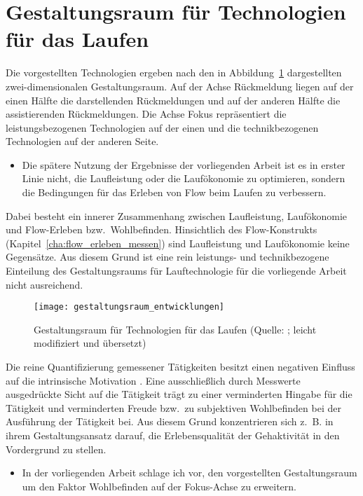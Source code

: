 

\section{Gestaltungsraum für Technologien für das Laufen} 

\label{sec:gestaltungsraum_fur_technologien_fur_das_laufen}

Die vorgestellten Technologien ergeben nach \citet{Jensen2014} den in Abbildung~\ref{fig:gestaltungsraum_entwicklungen} dargestellten zwei-dimensionalen Gestaltungsraum. Auf der Achse Rückmeldung liegen auf der einen Hälfte die darstellenden Rückmeldungen und auf der anderen Hälfte die assistierenden Rückmeldungen. Die Achse Fokus repräsentiert die leistungsbezogenen Technologien auf der einen und die technikbezogenen Technologien auf der anderen Seite. 
\begin{itemize}
	
	\item Die spätere Nutzung der Ergebnisse der vorliegenden Arbeit ist es in erster Linie nicht, die Laufleistung oder die Laufökonomie zu optimieren, sondern die Bedingungen für das Erleben von Flow beim Laufen zu verbessern. 
\end{itemize}

Dabei besteht ein innerer Zusammenhang zwischen Laufleistung, Laufökonomie und Flow-Erleben bzw.\ Wohlbefinden. Hinsichtlich des Flow-Konstrukts (Kapitel~\ref{cha:flow_erleben_messen}) sind Laufleistung und Laufökonomie keine Gegensätze. Aus diesem Grund ist eine rein leistungs- und technikbezogene Einteilung des Gestaltungsraums für Lauftechnologie für die vorliegende Arbeit nicht ausreichend. 
\begin{figure}
	[!htb] \centering 
	\texttt{[image: gestaltungsraum\_entwicklungen]} \caption[Gestaltungsraum für Technologien für das Laufen]{Gestaltungsraum für Technologien für das Laufen (Quelle: \citet{Jensen2014}; leicht modifiziert und übersetzt)}\label{fig:gestaltungsraum_entwicklungen} 
\end{figure}

Die reine Quantifizierung gemessener Tätigkeiten besitzt einen negativen Einfluss auf die intrinsische Motivation \citep{Etkin2016}. Eine ausschließlich durch Messwerte ausgedrückte Sicht auf die Tätigkeit trägt zu einer verminderten Hingabe für die Tätigkeit und verminderten Freude bzw.\ zu subjektiven Wohlbefinden bei der Ausführung der Tätigkeit bei. Aus diesem Grund konzentrieren sich z.~B. \citet{Hajinejad2015} in ihrem Gestaltungsansatz darauf, die Erlebensqualität der Gehaktivität in den Vordergrund zu stellen. 
\begin{itemize}
	
	\item In der vorliegenden Arbeit schlage ich vor, den vorgestellten Gestaltungsraum um den Faktor Wohlbefinden auf der Fokus-Achse zu erweitern. 
\end{itemize}

